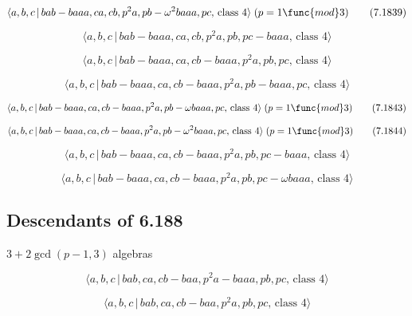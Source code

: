 \documentclass[10pt]{article}
\begin{document}
\begin{equation}
\langle a,b,c\,|\,bab-baaa,ca,cb,p^{2}a,pb-\omega ^{2}baaa,pc,\,\text{class }%
4\rangle \;(p=1\func{mod}3)  \tag{7.1839}
\end{equation}

\begin{equation}
\langle a,b,c\,|\,bab-baaa,ca,cb,p^2a,pb,pc-baaa,\,\text{class }4\rangle 
\tag{7.1840}
\end{equation}

\begin{equation}
\langle a,b,c\,|\,bab-baaa,ca,cb-baaa,p^2a,pb,pc,\,\text{class }4\rangle 
\tag{7.1841}
\end{equation}

\begin{equation}
\langle a,b,c\,|\,bab-baaa,ca,cb-baaa,p^2a,pb-baaa,pc,\,\text{class }4\rangle
\tag{7.1842}
\end{equation}

\begin{equation}
\langle a,b,c\,|\,bab-baaa,ca,cb-baaa,p^{2}a,pb-\omega baaa,pc,\,\text{class 
}4\rangle \;(p=1\func{mod}3)  \tag{7.1843}
\end{equation}

\begin{equation}
\langle a,b,c\,|\,bab-baaa,ca,cb-baaa,p^{2}a,pb-\omega ^{2}baaa,pc,\,\text{%
class }4\rangle \;(p=1\func{mod}3)  \tag{7.1844}
\end{equation}

\begin{equation}
\langle a,b,c\,|\,bab-baaa,ca,cb-baaa,p^2a,pb,pc-baaa,\,\text{class }4\rangle
\tag{7.1845}
\end{equation}

\begin{equation}
\langle a,b,c\,|\,bab-baaa,ca,cb-baaa,p^{2}a,pb,pc-\omega baaa,\,\text{class 
}4\rangle  \tag{7.1846}
\end{equation}

\subsection{Descendants of 6.188}

$3+2\gcd (p-1,3)$ algebras

\begin{equation}
\langle a,b,c\,|\,bab,ca,cb-baa,p^2a-baaa,pb,pc,\,\text{class }4\rangle 
\tag{7.1847}
\end{equation}

\begin{equation}
\langle a,b,c\,|\,bab,ca,cb-baa,p^2a,pb,pc,\,\text{class }4\rangle 
\tag{7.1848}
\end{equation}
\end{document}
